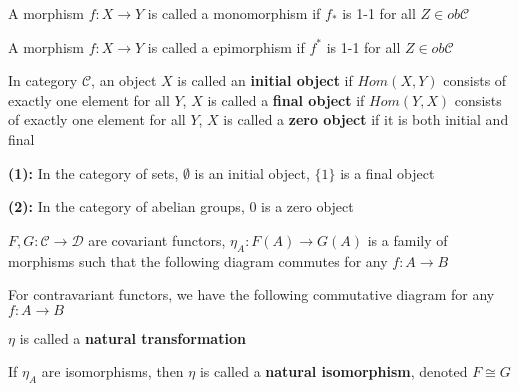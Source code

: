 \documentclass[../main.tex]{subfiles}
\begin{document}
\begin{definition}
A morphism $f:X\to Y$ is called a monomorphism if $f_*$ is 1-1 for all $Z\in ob\mathscr C$ \par
A morphism $f:X\to Y$ is called a epimorphism if $f^*$ is 1-1 for all $Z\in ob\mathscr C$
\end{definition}

\begin{definition}
In category $\mathscr C$, an object $X$ is called an \textbf{initial object} if $Hom(X,Y)$ consists of exactly one element for all $Y$, $X$ is called a \textbf{final object} if $Hom(Y,X)$ consists of exactly one element for all $Y$, $X$ is called a \textbf{zero object} if it is both initial and final
\end{definition}

\begin{example}
\textbf{(1): }In the category of sets, $\emptyset$ is an initial object, $\{1\}$ is a final object \par
\textbf{(2): }In the category of abelian groups, $0$ is a zero object
\end{example}

\begin{definition}
$F,G:\mathscr{C}\to\mathscr{D}$ are covariant functors, $\eta_A:F(A)\to G(A)$ is a family of morphisms such that the following diagram commutes for any $f:A\to B$ \par
{}
For contravariant functors, we have the following commutative diagram for any $f:A\to B$ \par
{}
$\eta$ is called a \textbf{natural transformation} \par
If $\eta_A$ are isomorphisms, then $\eta$ is called a \textbf{natural isomorphism}, denoted $F\cong G$
\end{definition}
\end{document}
